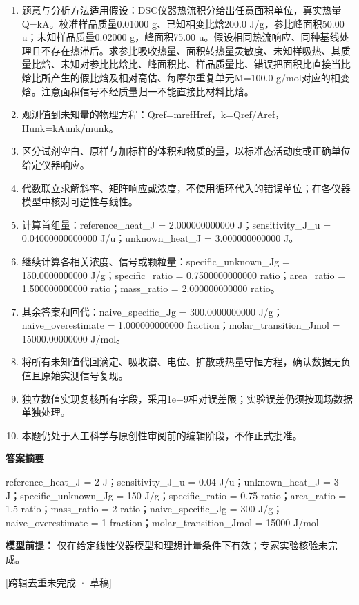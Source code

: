 \documentclass[UTF8,11pt,a4paper]{ctexart}
\begin{document}
\begin{enumerate}
\item 题意与分析方法适用假设：DSC仪器热流积分给出任意面积单位，真实热量Q=kA。校准样品质量0.01000 g、已知相变比焓200.0 J/g，参比峰面积50.00 u；未知样品质量0.02000 g，峰面积75.00 u。假设相同热流响应、同种基线处理且不存在热滞后。求参比吸收热量、面积转热量灵敏度、未知样吸热、其质量比焓、未知对参比比焓比、峰面积比、样品质量比、错误把面积比直接当比焓比所产生的假比焓及相对高估、每摩尔重复单元M=100.0 g/mol对应的相变焓。注意面积信号不经质量归一不能直接比材料比焓。
\item 观测值到未知量的物理方程：Qref=mrefHref，k=Qref/Aref，Hunk=kAunk/munk。
\item 区分试剂空白、原样与加标样的体积和物质的量，以标准态活动度或正确单位给定仪器响应。
\item 代数联立求解斜率、矩阵响应或浓度，不使用循环代入的错误单位；在各仪器模型中核对可逆性与线性。
\item 计算首组量：reference\_heat\_J = 2.000000000000 J；sensitivity\_J\_u = 0.04000000000000 J/u；unknown\_heat\_J = 3.000000000000 J。
\item 继续计算各相关浓度、信号或颗粒量：specific\_unknown\_Jg = 150.0000000000 J/g；specific\_ratio = 0.7500000000000 ratio；area\_ratio = 1.500000000000 ratio；mass\_ratio = 2.000000000000 ratio。
\item 其余答案和回代：naive\_specific\_Jg = 300.0000000000 J/g；naive\_overestimate = 1.000000000000 fraction；molar\_transition\_Jmol = 15000.00000000 J/mol。
\item 将所有未知值代回滴定、吸收谱、电位、扩散或热量守恒方程，确认数据无负值且原始实测信号复现。
\item 独立数值实现复核所有字段，采用1e−9相对误差限；实验误差仍须按现场数据单独处理。
\item 本题仍处于人工科学与原创性审阅前的编辑阶段，不作正式批准。
\end{enumerate}
\noindent\textbf{答案摘要}\par
reference\_heat\_J = 2 J；sensitivity\_J\_u = 0.04 J/u；unknown\_heat\_J = 3 J；specific\_unknown\_Jg = 150 J/g；specific\_ratio = 0.75 ratio；area\_ratio = 1.5 ratio；mass\_ratio = 2 ratio；naive\_specific\_Jg = 300 J/g；naive\_overestimate = 1 fraction；molar\_transition\_Jmol = 15000 J/mol\par
\noindent\textbf{模型前提：}
仅在给定线性仪器模型和理想计量条件下有效；专家实验核验未完成。\par
\noindent\textcolor{red!65!black}{[跨辑去重未完成 · 草稿]} \par
\medskip\hrule\medskip
{}
\end{document}
